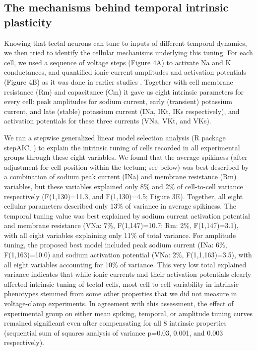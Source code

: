 \documentclass{article}
\begin{document}
\subsection*{The mechanisms behind temporal intrinsic plasticity}

Knowing that tectal neurons can tune to inputs of different temporal dynamics, we then tried to identify the cellular mechanisms underlying this tuning. For each cell, we used a sequence of voltage steps (Figure 4A) to activate Na and K conductances, and quantified ionic current amplitudes and activation potentials (Figure 4B) as it was done in earlier studies \citep{ciarleglio2015}. Together with cell membrane resistance (Rm) and capacitance (Cm) it gave us eight intrinsic parameters for every cell: peak amplitudes for sodium current, early (transient) potassium current, and late (stable) potassium current (INa, IKt, IKs respectively), and activation potentials for these three currents (VNa, VKt, and VKs). 

We ran a stepwise generalized linear model selection analysis (R package stepAIC, \citealt{venables2013}) to explain the intrinsic tuning of cells recorded in all experimental groups through these eight variables. We found that the average spikiness (after adjustment for cell position within the tectum; see below) was best described by a combination of sodium peak current (INa) and membrane resistance (Rm) variables, but these variables explained only 8\% and 2\% of cell-to-cell variance respectively (F(1,130)=11.3, and F(1,130)=4.5; Figure 3E). Together, all eight cellular parameters described only 13\% of variance in average spikiness. The temporal tuning value was best explained by sodium current activation potential and membrane resistance (VNa: 7\%, F(1,147)=10.7; Rm: 2\%, F(1,147)=3.1), with all eight variables explaining only 11\% of total variance. For amplitude tuning, the proposed best model included peak sodium current (INa: 6\%, F(1,163)=10.0) and sodium activation potential (VNa: 2\%, F(1,1,163)=3.5), with all eight variables accounting for 10\% of variance. This very low total explained variance indicates that while ionic currents and their activation potentials clearly affected intrinsic tuning of tectal cells, most cell-to-cell variability in intrinsic phenotypes stemmed from some other properties that we did not measure in voltage-clamp experiments. In agreement with this assessment, the effect of experimental group on either mean spiking, temporal, or amplitude tuning curves remained significant even after compensating for all 8 intrinsic properties (sequential sum of squares analysis of variance p=0.03, 0.001, and 0.003 respectively).
\end{document}
